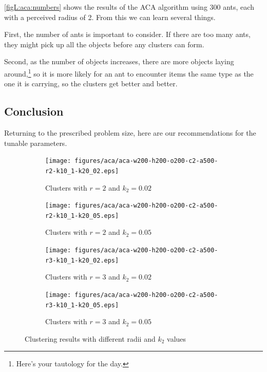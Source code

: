 \documentclass[12pt]{article}
\begin{document}
\autoref{figL:aca:numbers} shows the results of the ACA algorithm using 300 ants, each with a perceived radius of 2.
From this we can learn several things.

First, the number of ants is important to consider.
If there are too many ants, they might pick up all the objects before any clusters can form.

Second, as the number of objects increases, there are more objects laying around,\footnote{Here's your tautology for the day.} so it is more likely for an ant to encounter items the same type as the one it is carrying, so the clusters get better and better.

\subsection{Conclusion}
Returning to the prescribed problem size, here are our recommendations for the tunable parameters.

\begin{figure}
    \centering
    \begin{subfigure}[t]{0.4\textwidth}
        \centering
        \texttt{[image: figures/aca/aca-w200-h200-o200-c2-a500-r2-k10\_1-k20\_02.eps]}
        \caption{Clusters with $r=2$ and $k_2 = 0.02$}\label{fig:aca:prob-r2-k2-02}
    \end{subfigure}%
    \begin{subfigure}[t]{0.4\textwidth}
        \centering
        \texttt{[image: figures/aca/aca-w200-h200-o200-c2-a500-r2-k10\_1-k20\_05.eps]}
        \caption{Clusters with $r=2$ and $k_2 = 0.05$}\label{fig:aca:prob-r2-k2-05}
    \end{subfigure}%

    \begin{subfigure}[b]{0.4\textwidth}
        \centering
        \texttt{[image: figures/aca/aca-w200-h200-o200-c2-a500-r3-k10\_1-k20\_02.eps]}
        \caption{Clusters with $r=3$ and $k_2 = 0.02$}\label{fig:aca:prob-r3-k2-02}
    \end{subfigure}%
    \begin{subfigure}[b]{0.4\textwidth}
        \centering
        \texttt{[image: figures/aca/aca-w200-h200-o200-c2-a500-r3-k10\_1-k20\_05.eps]}
        \caption{Clusters with $r=3$ and $k_2 = 0.05$}\label{fig:aca:prob-r3-k2-05}
    \end{subfigure}%
    \caption{Clustering results with different radii and $k_2$ values}\label{fig:aca:prob-radii-k2}
\end{figure}
\end{document}

